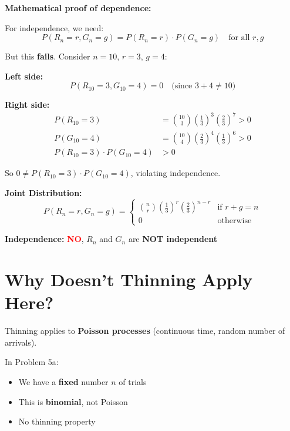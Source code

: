 \documentclass[12pt]{article}
\begin{document}
\textbf{Mathematical proof of dependence:}

For independence, we need:
\begin{equation*}
P(R_n = r, G_n = g) = P(R_n = r) \cdot P(G_n = g) \quad \text{for all } r, g
\end{equation*}

But this \textbf{fails}. Consider $n = 10$, $r = 3$, $g = 4$:

\textbf{Left side:}
\begin{equation*}
P(R_{10} = 3, G_{10} = 4) = 0 \quad \text{(since $3 + 4 \neq 10$)}
\end{equation*}

\textbf{Right side:}
\begin{align*}
P(R_{10} = 3) &= \binom{10}{3}\left(\frac{1}{3}\right)^3\left(\frac{2}{3}\right)^7 > 0\\
P(G_{10} = 4) &= \binom{10}{4}\left(\frac{2}{3}\right)^4\left(\frac{1}{3}\right)^6 > 0\\
P(R_{10} = 3) \cdot P(G_{10} = 4) &> 0
\end{align*}

So $0 \neq P(R_{10} = 3) \cdot P(G_{10} = 4)$, violating independence.

\begin{tcolorbox}[colback=red!5!white,colframe=red!75!black,title=Answer for 5a]
\textbf{Joint Distribution:}
\begin{equation*}
P(R_n = r, G_n = g) = \begin{cases}
\binom{n}{r}\left(\frac{1}{3}\right)^r\left(\frac{2}{3}\right)^{n-r} & \text{if } r + g = n\\
0 & \text{otherwise}
\end{cases}
\end{equation*}

\textbf{Independence:} \textcolor{red}{\textbf{NO}}, $R_n$ and $G_n$ are \textbf{NOT independent}
\end{tcolorbox}

\section*{Why Doesn't Thinning Apply Here?}

Thinning applies to \textbf{Poisson processes} (continuous time, random number of arrivals).

In Problem 5a:
\begin{itemize}
    \item We have a \textbf{fixed} number $n$ of trials
    \item This is \textbf{binomial}, not Poisson
    \item No thinning property
\end{itemize}
\end{document}
